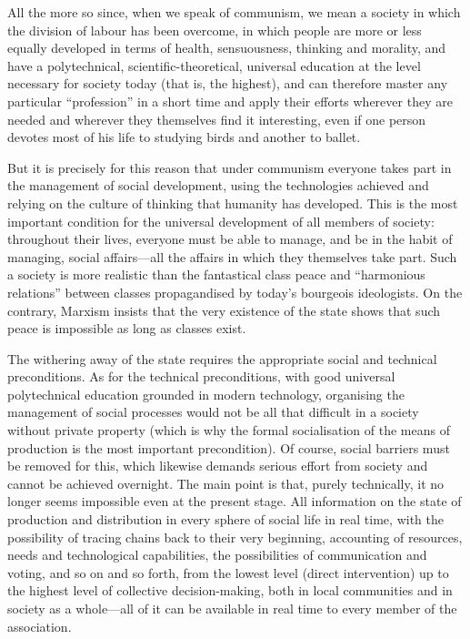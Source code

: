 \documentclass[12pt,a4paper,openany]{book}
\begin{document}
All the more so since, when we speak of communism, we mean a society in which the division of labour has been overcome, in which people are more or less equally developed in terms of health, sensuousness, thinking and morality, and have a polytechnical, scientific-theoretical, universal education at the level necessary for society today (that is, the highest), and can therefore master any particular “profession” in a short time and apply their efforts wherever they are needed and wherever they themselves find it interesting, even if one person devotes most of his life to studying birds and another to ballet.

But it is precisely for this reason that under communism everyone takes part in the management of social development, using the technologies achieved and relying on the culture of thinking that humanity has developed. This is the most important condition for the universal development of all members of society: throughout their lives, everyone must be able to manage, and be in the habit of managing, social affairs—all the affairs in which they themselves take part. Such a society is more realistic than the fantastical class peace and “harmonious relations” between classes propagandised by today’s bourgeois ideologists. On the contrary, Marxism insists that the very existence of the state shows that such peace is impossible as long as classes exist.

The withering away of the state requires the appropriate social and technical preconditions. As for the technical preconditions, with good universal polytechnical education grounded in modern technology, organising the management of social processes would not be all that difficult in a society without private property (which is why the formal socialisation of the means of production is the most important precondition). Of course, social barriers must be removed for this, which likewise demands serious effort from society and cannot be achieved overnight. The main point is that, purely technically, it no longer seems impossible even at the present stage. All information on the state of production and distribution in every sphere of social life in real time, with the possibility of tracing chains back to their very beginning, accounting of resources, needs and technological capabilities, the possibilities of communication and voting, and so on and so forth, from the lowest level (direct intervention) up to the highest level of collective decision-making, both in local communities and in society as a whole—all of it can be available in real time to every member of the association.
\end{document}
